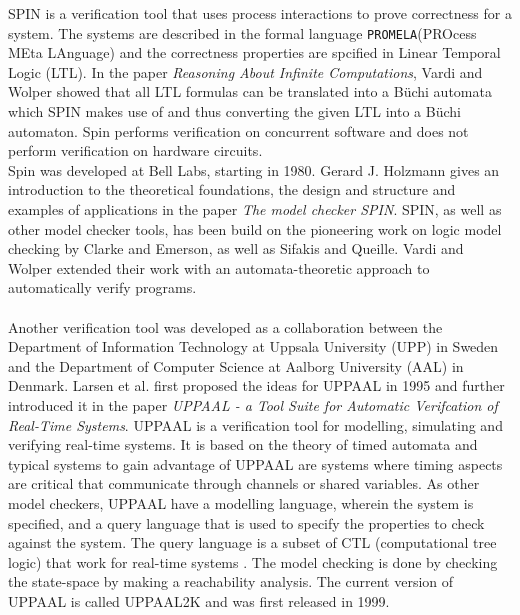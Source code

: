 \documentclass[a4paper]{report}
\begin{document}
SPIN\cite{spin} is a verification tool that uses process interactions to prove correctness for a system. The systems are described in the formal language \texttt{PROMELA}(PROcess MEta LAnguage)\cite{Holzmann1991} and the correctness properties are spcified in Linear Temporal Logic (LTL)\cite{Pnueli1977}. In the paper \textit{Reasoning About Infinite Computations}\cite{Vardi1994}, Vardi and Wolper showed that all LTL formulas can be translated into a B\"uchi automata which SPIN makes use of and thus converting the given LTL into a B\"uchi automaton. Spin performs verification on concurrent software and does not perform verification on hardware circuits. \\
Spin was developed at Bell Labs, starting in 1980. Gerard J. Holzmann gives an introduction to the theoretical foundations, the design and structure and examples of applications in the paper \textit{The model checker SPIN}\cite{Holzmann1997}. SPIN, as well as other model checker tools, has been build on the pioneering work on logic model checking by Clarke and Emerson\cite{Clarke1981}, as well as Sifakis and Queille\cite{Queille1982}. Vardi and Wolper extended their work with an automata-theoretic approach to automatically verify programs\cite{Vardi1986}.\\\\
Another verification tool was developed as a collaboration between the Department of Information Technology at Uppsala University (UPP) in Sweden and the Department of Computer Science at Aalborg University (AAL) in Denmark. Larsen et al. first proposed the ideas for UPPAAL\cite{Larsen1995} in 1995 and further introduced it in the paper \textit{UPPAAL - a Tool Suite for Automatic Verifcation of Real-Time Systems}\cite{Bengtsson1995}. 
UPPAAL is a verification tool for modelling, simulating and verifying real-time systems.
It is based on the theory of timed automata\cite{Hopcroft2001}\cite{Alur1990} and typical systems to gain advantage of UPPAAL are systems where timing aspects are critical that communicate through channels or shared variables.
As other model checkers, UPPAAL have a modelling language, wherein the system is specified, and a query language that is used to specify the properties to check against the system. The query language is a subset of CTL (computational tree logic) that work for real-time systems\cite{Henzinger1994} \cite{Larsen1995}. The model checking is done by checking the state-space by making a reachability analysis. The current version of UPPAAL is called UPPAAL2K and was first released in 1999\cite{Amnell2001}. \\\\
\end{document}

